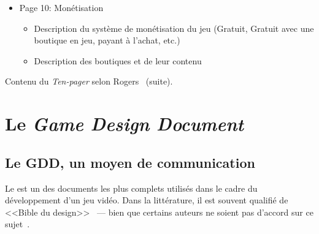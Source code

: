 \begin{table}[H]
\begin{framed}
\begin{itemize}
    \item Page 10: Monétisation
    \begin{itemize}
        \item Description du système de monétisation du jeu (Gratuit, Gratuit avec une boutique en jeu, payant à l'achat, etc.)
        \item Description des boutiques et de leur contenu
    \end{itemize}
\end{itemize}
\end{framed}
\caption{Contenu du \emph{Ten-pager} selon Rogers~\cite{LevelUpRogers2014} (suite).}
\label{ten-pager.table}
\end{table}




\section{Le \emph{Game Design Document}}
\label{sect.GDD}





\subsection{Le GDD, un moyen de communication}


Le  est un des documents les plus complets utilis\'es dans le cadre du développement d'un jeu vidéo.
Dans la littérature, il est souvent qualifié de <<Bible du design>>~\cite{GD_foundations_pedersen} --- bien que certains auteurs ne soient pas d'accord sur ce sujet~\cite{LevelUpRogers2014}. 

